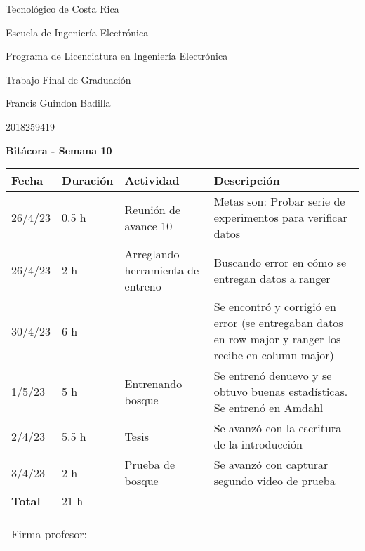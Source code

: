 \documentclass[12pt,oneside]{book}
\begin{document}
 \graphicspath{{./}{../tesis/fig/}}
  Tecnológico de Costa Rica
  \par\vspace{1mm}
  Escuela de Ingeniería Electrónica
  \par\vspace{1mm}
  Programa de Licenciatura en Ingeniería Electrónica
  \par\vspace{10mm}
  Trabajo Final de Graduación
  \par\vspace{1mm}
  Francis Guindon Badilla
  \par\vspace{1mm}
  2018259419
  \par\vspace{10mm}
  \large\textbf{Bitácora - Semana 10}
  \par\vspace{10mm}
  \small

  \begin{table} [!h]
    \centering
    \small
    \begin{tabular}{p{1.5 cm} p{2.1 cm} p{5 cm} p{8 cm}}
      \hline
      Fecha & Duración & Actividad & Descripción \\
      \hline
      26/4/23 & 0.5 h & Reunión de avance 10 & Metas son: Probar serie de experimentos para verificar datos \\
      26/4/23 & 2 h & Arreglando herramienta de entreno & Buscando error en cómo se entregan datos a ranger \\
      30/4/23 & 6 h & & Se encontró y corrigió en error (se entregaban datos en row major y ranger los recibe en column major) \\
      1/5/23 & 5 h &  Entrenando bosque & Se entrenó denuevo y se obtuvo buenas estadísticas. Se entrenó en Amdahl \\
      2/4/23 & 5.5 h & Tesis & Se avanzó con la escritura de la introducción \\
      3/4/23 & 2 h & Prueba de bosque & Se avanzó con capturar segundo video de prueba \\
      \hline
      \textbf{Total} & 21 h \\
      \hline
    \end{tabular}
  \end{table}
  
  \vfill

  \begin{tabular}{p{3 cm} p{10 cm}}
    Firma profesor: & \\
    \cline{2-2}
  \end{tabular}
\end{document}
